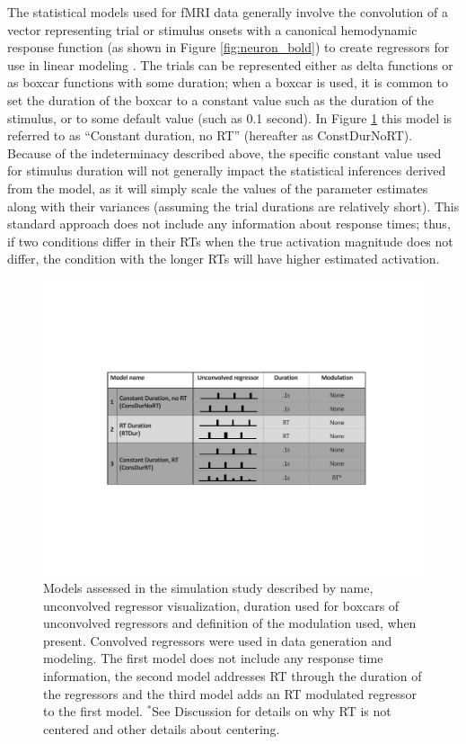 \documentclass[titlepage,12pt] {article}
\begin{document}
The statistical models used for fMRI data generally involve the convolution of a vector representing trial or stimulus onsets with a canonical hemodynamic response function (as shown in Figure \ref{fig:neuron_bold})  to create regressors for use in linear modeling \citep{PoldrackMumfordNichols2009}.  The trials can be represented either as delta functions or as boxcar functions with some duration; when a boxcar is used, it is common to set the duration of the boxcar to a constant value such as the duration of the stimulus, or to some default value (such as 0.1 second).  In Figure \ref{fig:models} this model is referred to as ``Constant duration, no RT'' (hereafter as ConstDurNoRT).  Because of the indeterminacy described above, the specific constant value used for stimulus duration will not generally impact the statistical inferences derived from the model, as it will simply scale the values of the parameter estimates along with their variances (assuming the trial durations are relatively short).   This standard approach does not include any information about response times; thus, if two conditions differ in their RTs when the true activation magnitude does not differ, the condition with the longer RTs will have higher estimated activation.  

\begin{figure}
  \centering
   \includegraphics[width=6in]{Figures/model_explainer_new.pdf}
   \caption{Models assessed in the simulation study described by name, unconvolved regressor visualization, duration used for boxcars of unconvolved regressors and definition of the modulation used, when present.  Convolved regressors were used in data generation and modeling.  The first model does not include any response time information, the second model addresses RT through the duration of the regressors and the third model adds an RT modulated regressor to the first model.  $^*$See Discussion for details on why RT is not centered and other details about centering.}
  \label{fig:models}
\end{figure}
\end{document}
